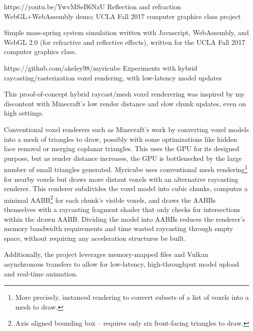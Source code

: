 \ifdefined\CV
{}
\fi

%
{https://youtu.be/YwvMSeB6NzU}%
{Reflection and refraction WebGL+WebAssembly demo;
UCLA Fall 2017 computer graphics class project}
\ifdefined\CV

Simple mass-spring system simulation written with Javascript,
WebAssembly, and WebGL 2.0 (for refractive and reflective effects),
written for the UCLA Fall 2017 computer graphics class.

\hfill{}
\fi
\filbreak

%
{https://github.com/akeley98/myricube}%
{Experiments with hybrid raycasting/rasterization voxel rendering,
with low-latency model updates}
\ifdefined\CV

This proof-of-concept hybrid raycast/mesh voxel renderering was
inspired by my discontent with Minecraft's low render distance and
slow chunk updates, even on high settings.

Conventional voxel renderers such as Minecraft's work by converting
voxel models into a mesh of triangles to draw, possibly with some
optimizations like hidden face removal or merging coplanar
triangles. This uses the GPU for its designed purpose, but as render
distance increases, the GPU is bottlenecked by the large number of
small triangles generated. Myricube uses conventional mesh
rendering\footnote{More precisely, instanced rendering to convert
subsets of a list of voxels into a mesh to draw.} for nearby voxels
but draws more distant voxels with an alternative raycasting
renderer. This renderer subdivides the voxel model into cubic chunks,
computes a minimal AABB\footnote{Axis aligned bounding box -- requires
only six front-facing triangles to draw.} for each chunk's visible
voxels, and draws the AABBs themselves with a raycasting fragment
shader that only checks for intersections within the drawn AABB.
Dividing the model into AABBs reduces the renderer's memory bandwidth
requirements and time wasted raycasting through empty space, without
requiring any acceleration structures be built.

Additionally, the project leverages memory-mapped files and Vulkan
asynchronous transfers to allow for low-latency, high-throughput model
upload and real-time animation.

\fi
\filbreak

